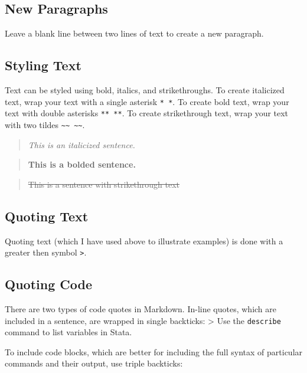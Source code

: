 \documentclass[]{book}
\theoremstyle{definition}
\theoremstyle{definition}
\theoremstyle{definition}
\theoremstyle{remark}
\begin{document}
\subsection{New Paragraphs}\label{new-paragraphs}

Leave a blank line between two lines of text to create a new paragraph.

\subsection{Styling Text}\label{styling-text}

Text can be styled using bold, italics, and strikethroughs. To create
italicized text, wrap your text with a single asterisk \texttt{*\ *}. To
create bold text, wrap your text with double asterisks \texttt{**\ **}.
To create strikethrough text, wrap your text with two tildes
\texttt{\textasciitilde{}\textasciitilde{}\ \textasciitilde{}\textasciitilde{}}.

\begin{quote}
\emph{This is an italicized sentence.}
\end{quote}

\begin{quote}
\textbf{This is a bolded sentence.}
\end{quote}

\begin{quote}
\sout{This is a sentence with strikethrough text}
\end{quote}

\subsection{Quoting Text}\label{quoting-text}

Quoting text (which I have used above to illustrate examples) is done
with a greater then symbol \texttt{\textgreater{}}.

\subsection{Quoting Code}\label{quoting-code}

There are two types of code quotes in Markdown. In-line quotes, which
are included in a sentence, are wrapped in single backticks:
\textgreater{} Use the \texttt{describe} command to list variables in
Stata.

To include code blocks, which are better for including the full syntax
of particular commands and their output, use triple backticks:
\end{document}
